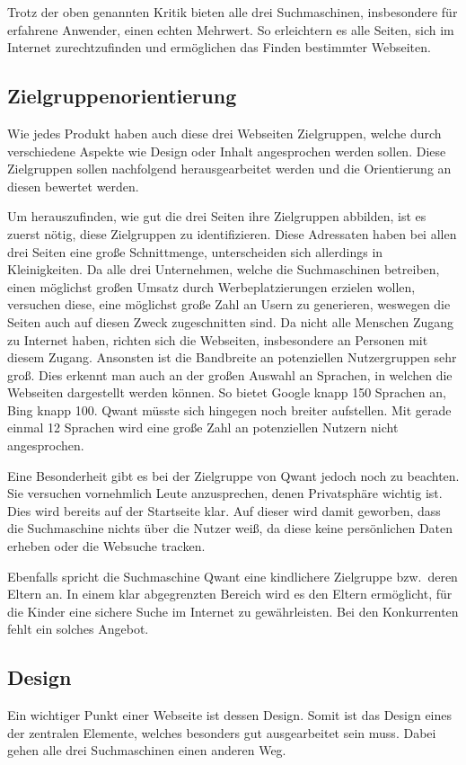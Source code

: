 Trotz der oben genannten Kritik bieten alle drei Suchmaschinen, insbesondere für erfahrene Anwender, einen echten Mehrwert.
So erleichtern es alle Seiten, sich im Internet zurechtzufinden und ermöglichen das Finden bestimmter Webseiten.

\subsection{Zielgruppenorientierung}\label{subsec:zielgruppenorientierung}
Wie jedes Produkt haben auch diese drei Webseiten Zielgruppen, welche durch verschiedene Aspekte wie Design oder Inhalt
angesprochen werden sollen.
Diese Zielgruppen sollen nachfolgend herausgearbeitet werden und die Orientierung an diesen
bewertet werden.

Um herauszufinden, wie gut die drei Seiten ihre Zielgruppen abbilden, ist es zuerst nötig, diese Zielgruppen zu identifizieren.
Diese Adressaten haben bei allen drei Seiten eine große Schnittmenge, unterscheiden sich allerdings in Kleinigkeiten.
Da alle drei Unternehmen, welche die Suchmaschinen betreiben, einen möglichst großen Umsatz durch Werbeplatzierungen
erzielen wollen, versuchen diese, eine möglichst große Zahl an Usern zu generieren, weswegen die Seiten auch auf diesen Zweck zugeschnitten sind.
Da nicht alle Menschen Zugang zu Internet haben, richten sich die Webseiten, insbesondere an Personen mit diesem Zugang.
Ansonsten ist die Bandbreite an potenziellen Nutzergruppen sehr groß.
Dies erkennt man auch an der großen Auswahl an Sprachen, in welchen die Webseiten dargestellt werden können.
So bietet Google knapp 150 Sprachen an, Bing knapp 100.
Qwant müsste sich hingegen noch breiter aufstellen.
Mit gerade einmal 12 Sprachen wird eine große Zahl an
potenziellen Nutzern nicht angesprochen.

Eine Besonderheit gibt es bei der Zielgruppe von Qwant jedoch noch zu beachten.
Sie versuchen vornehmlich Leute anzusprechen, denen Privatsphäre wichtig ist.
Dies wird bereits auf der Startseite klar.
Auf dieser wird damit geworben, dass die Suchmaschine
nichts über die Nutzer weiß, da diese keine persönlichen Daten erheben oder die Websuche tracken.

Ebenfalls spricht die Suchmaschine Qwant eine kindlichere Zielgruppe bzw.\ deren Eltern an.
In einem klar abgegrenzten Bereich wird es den Eltern ermöglicht, für die Kinder eine sichere Suche im Internet zu gewährleisten.
Bei den Konkurrenten fehlt ein solches Angebot.

\subsection{Design}\label{subsec:design}
Ein wichtiger Punkt einer Webseite ist dessen Design.
\autocite[Seite 43]{Thielsch2}
Somit ist das Design eines der zentralen Elemente, welches besonders gut ausgearbeitet sein muss.
Dabei gehen alle drei Suchmaschinen einen anderen Weg.

